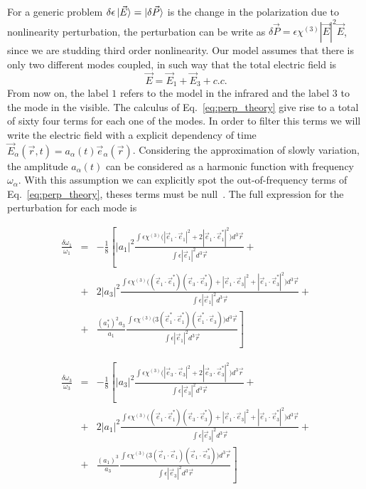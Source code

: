 For a generic problem $\delta\epsilon\ket{\vec{E}}=\ket{\delta\vec{P}}$ is the change in the polarization due to nonlinearity perturbation, the perturbation can be write as $\delta\vec{P} = \epsilon\chi^{(3)}|\vec{E}|^2\vec{E}$, since we are studding third order nonlinearity. Our model assumes that there is only two different modes coupled, in such way that the total electric field is
\begin{equation}
    \vec{E} = \vec{E}_1+\vec{E}_3+c.c.
\end{equation}
From now on, the label $1$ refers to the model in the infrared and the label $3$ to the mode in the visible. 
The calculus of Eq.~\ref{eq:perp_theory} give rise to a total of sixty four terms for each one of the modes. In order to filter this terms we will write the electric field with a explicit dependency of time $\vec{E}_\alpha(\vec{r},t) = a_\alpha(t) \vec{e}_\alpha(\vec{r})$. Considering the approximation of slowly variation, the amplitude $a_\alpha(t)$ can be considered as a harmonic function with frequency $\omega_\alpha$. With this assumption we can explicitly spot the out-of-frequency terms of Eq.~\ref{eq:perp_theory}, theses terms must be null~\cite{Boyd2003}. The full expression for the perturbation for each mode is

\begin{eqnarray}
\frac{\delta\omega_1}{\omega_1} &=& -\frac{1}{8}\left[|a_1|^2\frac{\int\epsilon\chi^{(3)}
\Big(|\vec{e}_1\cdot\vec{e}_1|^2 + 2|\vec{e}_1\cdot\vec{e}_1^*|^2
\Big)d^3\vec{r}}
{\int \epsilon|\vec{e}_1|^2 d^3\vec{r}}\right. +\nonumber\\
&+&2|a_3|^2\frac{\int\epsilon\chi^{(3)}
\Big((\vec{e}_1\cdot\vec{e}_1^*)(\vec{e}_3\cdot\vec{e}_3^*)+|\vec{e}_1\cdot\vec{e}_3|^2+|\vec{e}_1\cdot\vec{e}^*_3|^2
\Big)d^3\vec{r}}
{\int \epsilon|\vec{e}_1|^2 d^3\vec{r}}+\nonumber\\
&+&\left.\frac{(a^*_1)^2a_3}{a_1}\frac{\int\epsilon\chi^{(3)}
\Big(3(\vec{e}^*_1\cdot\vec{e}_1^*)(\vec{e}^*_1\cdot\vec{e}_3)
\Big)d^3\vec{r}}
{\int \epsilon|\vec{e}_1|^2 d^3\vec{r}}\right]
\end{eqnarray}

\begin{eqnarray}
\frac{\delta\omega_3}{\omega_3} &=& -\frac{1}{8}\left[|a_3|^2\frac{\int\epsilon\chi^{(3)}
\Big(|\vec{e}_3\cdot\vec{e}_3|^2 + 2|\vec{e}_3\cdot\vec{e}_3^*|^2
\Big)d^3\vec{r}}
{\int \epsilon|\vec{e}_3|^2 d^3\vec{r}}\right. +\nonumber\\
&+&2|a_1|^2\frac{\int\epsilon\chi^{(3)}
\Big((\vec{e}_1\cdot\vec{e}_1^*)(\vec{e}_3\cdot\vec{e}_3^*)+|\vec{e}_1\cdot\vec{e}_3|^2+|\vec{e}_1\cdot\vec{e}^*_3|^2
\Big)d^3\vec{r}}
{\int \epsilon|\vec{e}_3|^2 d^3\vec{r}}+\nonumber\\
&+&\left.\frac{(a_1)^3}{a_3}\frac{\int\epsilon\chi^{(3)}
\Big(3(\vec{e}_1\cdot\vec{e}_1)(\vec{e}_1\cdot\vec{e}^*_3)
\Big)d^3\vec{r}}
{\int \epsilon|\vec{e}_3|^2 d^3\vec{r}}\right]
\end{eqnarray}

